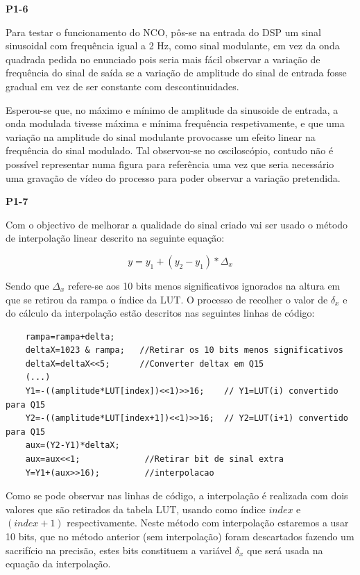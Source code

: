 \documentclass[11pt]{article}
\begin{document}
\textbf{P1-6}
\label{para:P1-6}

Para testar o funcionamento do NCO, pôs-se na entrada do DSP um sinal sinusoidal com frequência igual a 2 Hz, como sinal modulante, em vez da onda quadrada pedida no enunciado pois seria mais fácil observar a variação de frequência do sinal de saída se a variação de amplitude do sinal de entrada fosse gradual em vez de ser constante com descontinuidades. 
\vspace{1 mm}

Esperou-se que, no máximo e mínimo de amplitude da sinusoide de entrada, a onda modulada tivesse máxima e mínima frequência respetivamente, e que uma variação na amplitude do sinal modulante provocasse um efeito linear na frequência do sinal modulado. Tal observou-se no osciloscópio, contudo não é possível representar numa figura para referência uma vez que seria necessário uma gravação de vídeo do processo para poder observar a variação pretendida.
\vspace{2 mm}

\textbf{P1-7}

Com o objectivo de melhorar a qualidade do sinal criado vai ser usado o método de interpolação linear descrito na seguinte equação:

\begin{equation}
y=y_{1}+(y_{2}-y_{1})*\Delta_{x}
\end{equation}

Sendo que $ \Delta_{x} $ refere-se aos 10 bits menos significativos ignorados na altura em que se retirou da rampa o índice da LUT. O processo de recolher o valor de $ \delta_{x} $ e do cálculo da interpolação estão descritos nas seguintes linhas de código:

\begin{lstlisting}
	rampa=rampa+delta;
	deltaX=1023 & rampa;   //Retirar os 10 bits menos significativos
	deltaX=deltaX<<5;      //Converter deltax em Q15
	(...)
	Y1=-((amplitude*LUT[index])<<1)>>16;	// Y1=LUT(i) convertido para Q15
	Y2=-((amplitude*LUT[index+1])<<1)>>16;	// Y2=LUT(i+1) convertido para Q15
	aux=(Y2-Y1)*deltaX;		
	aux=aux<<1;				//Retirar bit de sinal extra
	Y=Y1+(aux>>16);			//interpolacao	
\end{lstlisting}

Como se pode observar nas linhas de código, a interpolação é realizada com dois valores que são retirados da tabela LUT, usando como índice $\textit{index}$ \hspace{0,1 mm} e $(\textit{index}+1)$ respectivamente. Neste método com interpolação estaremos a usar 10 bits, que no método anterior (sem interpolação) foram descartados fazendo um sacrifício na precisão,  estes bits constituem a variável $ \delta_{x} $ que será usada na equação da interpolação.
\end{document}
